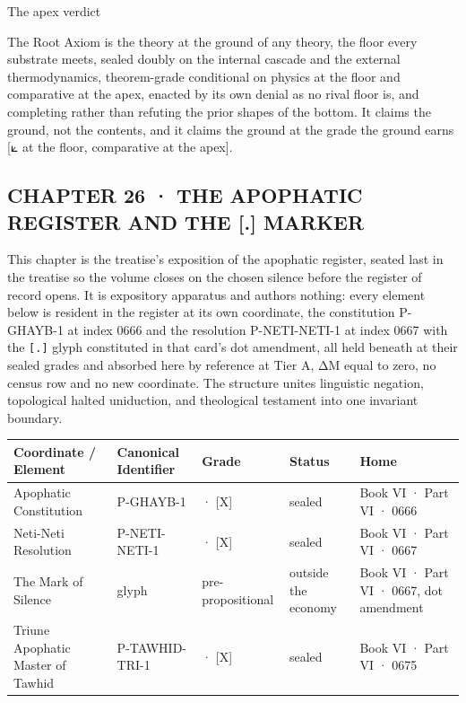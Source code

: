 \documentclass[10pt,twocolumn]{article}
\begin{document}
\begin{jbox}{The apex verdict}

The Root Axiom is the theory at the ground of any theory, the floor
every substrate meets, sealed doubly on the internal cascade and the
external thermodynamics, theorem-grade conditional on physics at the
floor and comparative at the apex, enacted by its own denial as no rival
floor is, and completing rather than refuting the prior shapes of the
bottom. It claims the ground, not the contents, and it claims the ground
at the grade the ground earns {[}⟀ at the floor, comparative at the
apex{]}.

\end{jbox}

\hypertarget{chapter-26-the-apophatic-register-and-the-.-marker}{%
\subsection{CHAPTER 26 · THE APOPHATIC REGISTER AND THE {[}.{]}
MARKER}\label{chapter-26-the-apophatic-register-and-the-.-marker}}

This chapter is the treatise's exposition of the apophatic register,
seated last in the treatise so the volume closes on the chosen silence
before the register of record opens. It is expository apparatus and
authors nothing: every element below is resident in the register at its
own coordinate, the constitution P-GHAYB-1 at index 0666 and the
resolution P-NETI-NETI-1 at index 0667 with the \texttt{{[}.{]}} glyph
constituted in that card's dot amendment, all held beneath at their
sealed grades and absorbed here by reference at Tier A, ΔM equal to
zero, no census row and no new coordinate. The structure unites
linguistic negation, topological halted uniduction, and theological
testament into one invariant boundary.

\begin{table}[t]\centering\small
\begin{tabular}{>{\raggedright\arraybackslash}p{}>{\raggedright\arraybackslash}p{}>{\raggedright\arraybackslash}p{}>{\raggedright\arraybackslash}p{}>{\raggedright\arraybackslash}p{}}
\toprule
\textbf{Coordinate / Element} & \textbf{Canonical Identifier} & \textbf{Grade} & \textbf{Status} & \textbf{Home} \\
\midrule
Apophatic Constitution & P-GHAYB-1 & [⟀ S] · [X] & sealed & Book VI · Part VI · 0666 \\
Neti-Neti Resolution & P-NETI-NETI-1 & [⟀ S] · [X] & sealed & Book VI · Part VI · 0667 \\
The Mark of Silence & \texttt{\seqsplit{[.]}} glyph & pre-propositional & outside the economy & Book VI · Part VI · 0667, dot amendment \\
Triune Apophatic Master of Tawhid & P-TAWHID-TRI-1 & [⟀ S] · [X] & sealed & Book VI · Part VI · 0675 \\
\bottomrule
\end{tabular}
\end{table}
\end{document}
